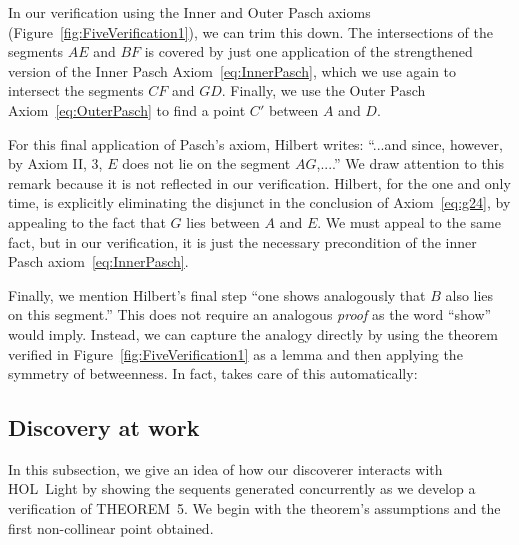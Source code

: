 In our verification using the Inner and Outer Pasch axioms (Figure~\ref{fig:FiveVerification1}), we can trim this down. The intersections of the segments $AE$ and $BF$ is covered by just one application of the strengthened version of the Inner Pasch Axiom~\eqref{eq:InnerPasch}, which we use again to intersect the segments $CF$ and $GD$. Finally, we use the Outer Pasch Axiom~\eqref{eq:OuterPasch} to find a point $C'$ between $A$ and $D$. 

For this final application of Pasch's axiom, Hilbert writes: ``...and since, however, by Axiom II, 3, $E$ does not lie on the segment $AG$,....'' We draw attention to this remark because it is not reflected in our verification. Hilbert, for the one and only time, is explicitly eliminating the disjunct in the conclusion of Axiom~\ref{eq:g24}, by appealing to the fact that $G$ lies between $A$ and $E$. We must appeal to the same fact, but in our verification, it is just the necessary precondition of the inner  Pasch axiom~\eqref{eq:InnerPasch}.

Finally, we mention Hilbert's final step ``one shows analogously that $B$ also lies on this segment.'' This does not require an analogous \emph{proof} as the word ``show'' would imply. Instead, we can capture the analogy directly by using the theorem verified in Figure~\ref{fig:FiveVerification1} as a lemma and then applying the symmetry of betweenness. In fact,  takes care of this automatically:

\linebreak

\subsection{Discovery at work}
In this subsection, we give an idea of how our discoverer interacts with HOL~Light by showing the sequents generated concurrently as we develop a verification of THEOREM~5. We begin with the theorem's assumptions and the first non-collinear point obtained.

\linebreak


